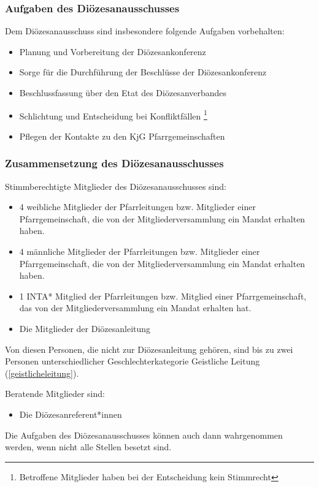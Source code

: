 \documentclass[12pt]{report}
\begin{document}
\begin{justify}
\subsubsection{Aufgaben des Diözesanausschusses}
Dem Diözesanausschuss sind insbesondere folgende Aufgaben vorbehalten:
\begin{itemize}
  \item Planung und Vorbereitung der Diözesankonferenz
  \item Sorge für die Durchführung der Beschlüsse der Diözesankonferenz
  \item Beschlussfassung über den Etat des Diözesanverbandes
  \item Schlichtung und Entscheidung bei Konfliktfällen
        \footnote{Betroffene Mitglieder haben bei der Entscheidung kein Stimmrecht}
  \item Pflegen der Kontakte zu den KjG Pfarrgemeinschaften
\end{itemize}

\subsubsection{Zusammensetzung des Diözesanausschusses}
Stimmberechtigte Mitglieder des Diözesanausschusses sind:
\begin{itemize}
  \item 4 weibliche Mitglieder der Pfarrleitungen bzw. Mitglieder einer Pfarrgemeinschaft, die von der
        Mitgliederversammlung ein Mandat erhalten haben.
  \item 4 männliche Mitglieder der Pfarrleitungen bzw. Mitglieder einer Pfarrgemeinschaft, die von
        der Mitgliederversammlung ein Mandat erhalten haben.
  \item 1 INTA* Mitglied der Pfarrleitungen bzw. Mitglied einer
  Pfarrgemeinschaft, das von der Mitgliederversammlung ein Mandat erhalten
  hat.
  \item Die Mitglieder der Diözesanleitung
\end{itemize}

Von diesen Personen, die nicht zur Diözesanleitung gehören, sind bis zu zwei
Personen unterschiedlicher Geschlechterkategorie Geistliche Leitung
 (\ref{geistlicheleitung}).

Beratende Mitglieder sind:
\begin{itemize}
  \item Die Diözesanreferent*innen
\end{itemize}

Die Aufgaben des Diözesanausschusses können auch dann wahrgenommen werden, wenn nicht
alle Stellen besetzt sind.


\end{justify}
\end{document}
